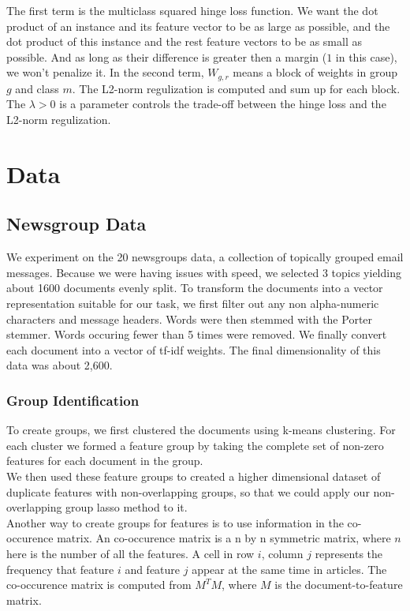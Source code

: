 \documentclass[11pt]{article}
\begin{document}
The first term is the multiclass squared hinge loss function. We want the dot product of an instance and its feature vector to be as large as possible, and the dot product of this instance and the rest feature vectors to be as small as possible. And as long as their difference is greater then a margin ($1$ in this case), we won't penalize it. In the second term, $W_{g,r}$ means a block of weights in group $g$ and class $m$. The L2-norm regulization is computed and sum up for each block. The $\lambda > 0$ is a parameter controls the trade-off between the hinge loss and the L2-norm regulization.  

\section{Data}

\subsection{Newsgroup Data}

We experiment on the 20 newsgroups data, a collection of topically grouped 
email messages. 
Because we were having issues with speed, we selected 3 topics yielding
about 1600 documents evenly split.
To transform the documents into a vector representation 
suitable for our task, we first filter out any non alpha-numeric characters
and message headers. Words were then stemmed with the Porter stemmer. 
Words occuring fewer than 5 times were removed.
We finally convert each document into a vector of tf-idf weights.
The final dimensionality of this data was about 2,600.

\subsubsection{Group Identification}

To create groups, we first clustered the documents using k-means clustering.
For each cluster we formed a feature group by taking the complete set of 
non-zero features for each document in the group.\\

We then used these feature groups to created a higher dimensional dataset of
duplicate features with non-overlapping groups, so that we could apply our
non-overlapping group lasso method to it.\\

Another way to create groups for features is to use information in the co-occurence matrix. An co-occurence matrix is a n by n symmetric matrix, where $n$ here is the number of all the features. A cell in row $i$, column $j$ represents the frequency that feature $i$ and feature $j$ appear at the same time in articles. The co-occurence matrix is computed from $M^T M$, where $M$ is the document-to-feature matrix. \\
\end{document}
